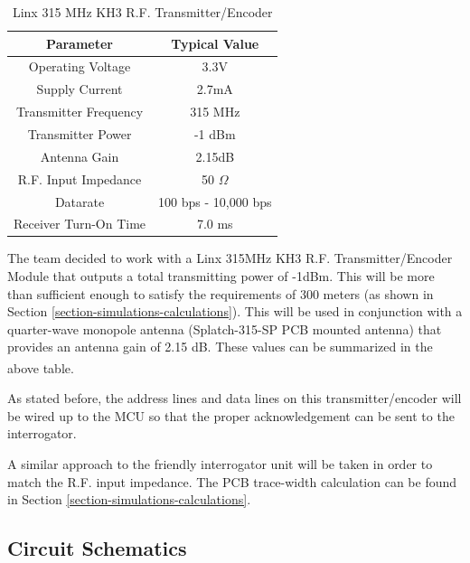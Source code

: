 \documentclass[letterpaper,10pt]{article}
\begin{document}
\begin{spacing}{1.15}
\begin{table}[htbp]
	\centering
	\begin{tabular}{c|c}	%
		\toprule	%
		Parameter & Typical Value \\
		\midrule
		Operating Voltage & 3.3V\\
		Supply Current & 2.7mA\\
		Transmitter Frequency & 315 MHz \\ 
		Transmitter Power & -1 dBm \\
		Antenna Gain & 2.15dB  \\
		R.F. Input Impedance & 50 $\Omega$ \\
		Datarate & 100 bps - 10,000 bps  \\
		Receiver Turn-On Time & 7.0 ms  \\
		\bottomrule	%
	\end{tabular}%
	\caption{Linx 315 MHz KH3 R.F. Transmitter/Encoder}
	\label{tab:rf-transmitter-important-values}	%
\end{table}%

The team decided to work with a Linx 315MHz KH3 R.F. Transmitter/Encoder Module that outputs a total transmitting power of -1dBm. This will be more than sufficient enough to satisfy the requirements of 300 meters (as shown in Section \ref{section-simulations-calculations}). This will be used in conjunction with a quarter-wave monopole antenna (Splatch-315-SP PCB mounted antenna) that provides an antenna gain of 2.15 dB. These values can be summarized in the above table\textsuperscript{\cite{Linx-Transmitter}\cite{Linx-Antenna}}.

As stated before, the address lines and data lines on this transmitter/encoder will be wired up to the MCU so that the proper acknowledgement can be sent to the interrogator.

A similar approach to the friendly interrogator unit will be taken in order to match the R.F. input impedance. The PCB trace-width calculation can be found in Section \ref{section-simulations-calculations}.



\subsection{Circuit Schematics} \label{section-circuit-schematics}


\end{spacing}
\end{document}
